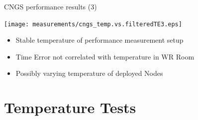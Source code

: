 \documentclass[compress,red]{beamer}
\begin{document}
\begin{frame}{CNGS performance results (3)}

	\begin{center}
		\texttt{[image: measurements/cngs\_temp.vs.filteredTE3.eps]}
	
		\begin{itemize}
			\item Stable temperature of performance measurement setup
			\item Time Error not correlated with temperature in WR Room
			\item Possibly varying temperature of deployed Nodes
		\end{itemize}	
		
	\end{center}




\end{frame}

\section{Temperature Tests}
\end{document}
